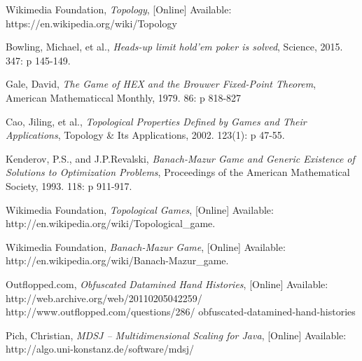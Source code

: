\documentclass[11pt]{article}
\begin{document}
\newpage
\begin{thebibliography}{9}

  Wikimedia Foundation,
  \emph{Topology},
  [Online] Available:
  https://en.wikipedia.org/wiki/Topology

  Bowling, Michael, et al.,
  \emph{Heads-up limit hold'em poker is solved},
  Science,
  2015. 347: p 145-149.
  
  Gale, David,
  \emph{The Game of HEX and the Brouwer Fixed-Point Theorem},
  American Mathematiccal Monthly,
  1979. 86: p 818-827
	
  Cao, Jiling, et al.,
  \emph{Topological Properties Defined by Games and Their Applications},
  Topology \& Its Applications,
  2002. 123(1): p 47-55.
  
  Kenderov, P.S., and J.P.Revalski,
  \emph{Banach-Mazur Game and Generic Existence of Solutions to Optimization Problems},
  Proceedings of the American Mathematical Society,
  1993. 118: p 911-917.
  
  Wikimedia Foundation,
  \emph{Topological Games},
  [Online]
  Available: http://en.wikipedia.org/wiki/Topological\_game.

  Wikimedia Foundation,
  \emph{Banach-Mazur Game},
  [Online] Available:
  http://en.wikipedia.org/wiki/Banach-Mazur\_game.
  
  Outflopped.com,
  \emph{Obfuscated Datamined Hand Histories},
  [Online] Available:
  http://web.archive.org/web/20110205042259/
  http://www.outflopped.com/questions/286/
  obfuscated-datamined-hand-histories
  
  Pich, Christian,
  \emph{MDSJ – Multidimensional Scaling for Java},
  [Online] Available: 
  http://algo.uni-konstanz.de/software/mdsj/

	
\end{thebibliography}
\end{document}
